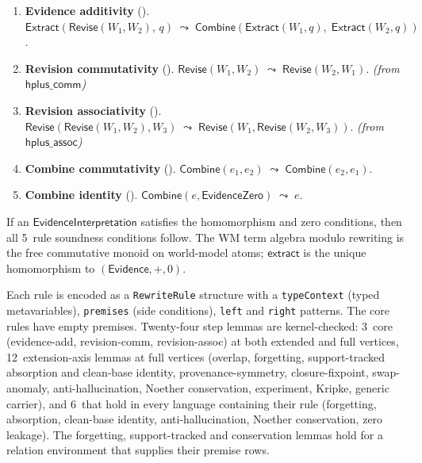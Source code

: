 \documentclass[11pt,openany]{report}
\begin{document}
\begin{enumerate}
\item \textbf{Evidence additivity} (\claimCore{}).
  $\mathsf{Extract}(\mathsf{Revise}(W_1, W_2),\, q) \;\leadsto\;
  \mathsf{Combine}(\mathsf{Extract}(W_1, q),\; \mathsf{Extract}(W_2, q))$.

\item \textbf{Revision commutativity} (\claimCore{}).
  $\mathsf{Revise}(W_1, W_2) \;\leadsto\; \mathsf{Revise}(W_2, W_1)$.
  \emph{(from $\mathsf{hplus\_comm}$)}

\item \textbf{Revision associativity} (\claimCore{}).
  $\mathsf{Revise}(\mathsf{Revise}(W_1, W_2), W_3)
  \;\leadsto\; \mathsf{Revise}(W_1, \mathsf{Revise}(W_2, W_3))$.
  \emph{(from $\mathsf{hplus\_assoc}$)}

\item \textbf{Combine commutativity} (\claimCore{}).
  $\mathsf{Combine}(e_1, e_2) \;\leadsto\; \mathsf{Combine}(e_2, e_1)$.

\item \textbf{Combine identity} (\claimCore{}).
  $\mathsf{Combine}(e, \mathsf{EvidenceZero}) \;\leadsto\; e$.
\end{enumerate}

\begin{theorem}
\label{thm:addcommmonoid}
If an $\mathsf{EvidenceInterpretation}$ satisfies the homomorphism and
zero conditions, then all 5~rule soundness conditions follow.
The WM term algebra modulo rewriting is the free commutative monoid on
world-model atoms; $\mathsf{extract}$ is the unique homomorphism to
$(\mathsf{Evidence}, +, 0)$.
\end{theorem}

Each rule is encoded as a \texttt{RewriteRule} structure with a
\texttt{typeContext} (typed metavariables), \texttt{premises} (side
conditions), \texttt{left} and \texttt{right} patterns.  The core rules
have empty premises.  Twenty-four step
lemmas are kernel-checked: 3~core (evidence-add, revision-comm,
revision-assoc) at both extended and full vertices, 12~extension-axis
lemmas at full vertices (overlap, forgetting, support-tracked absorption and
clean-base identity, provenance-symmetry, closure-fixpoint, swap-anomaly,
anti-hallucination, Noether conservation, experiment, Kripke, generic
carrier), and 6~that hold in every language containing their rule
(forgetting, absorption, clean-base identity, anti-hallucination, Noether
conservation, zero leakage).  The forgetting, support-tracked and
conservation lemmas hold for a relation environment that supplies their
premise rows.
\end{document}
